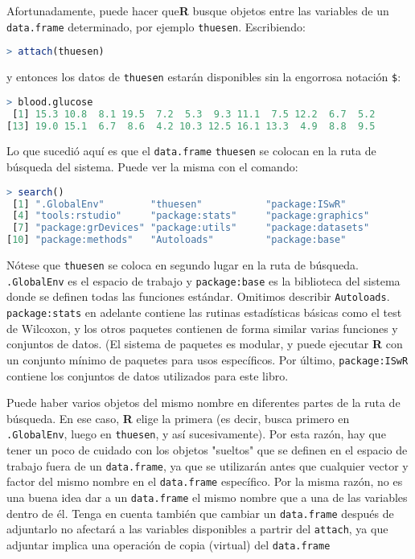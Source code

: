 Afortunadamente, puede hacer que\textbf{R} busque objetos entre las variables
de un \texttt{data.frame} determinado, por ejemplo \texttt{thuesen}. Escribiendo:

\begin{lstlisting}[language=R]
> attach(thuesen)
\end{lstlisting}

y entonces los datos de \texttt{thuesen} estarán disponibles sin la engorrosa
notación \texttt{\$}:

\begin{lstlisting}[language=R]
> blood.glucose
 [1] 15.3 10.8  8.1 19.5  7.2  5.3  9.3 11.1  7.5 12.2  6.7  5.2
[13] 19.0 15.1  6.7  8.6  4.2 10.3 12.5 16.1 13.3  4.9  8.8  9.5
\end{lstlisting}

Lo que sucedió aquí es que el \texttt{data.frame} \texttt{thuesen} se colocan en la
ruta de búsqueda del sistema. Puede ver la misma con el comando:

\begin{lstlisting}[language=R]
> search()
 [1] ".GlobalEnv"        "thuesen"           "package:ISwR"
 [4] "tools:rstudio"     "package:stats"     "package:graphics"
 [7] "package:grDevices" "package:utils"     "package:datasets"
[10] "package:methods"   "Autoloads"         "package:base"
\end{lstlisting}

Nótese que \texttt{thuesen} se coloca en segundo lugar en la ruta de búsqueda.
\texttt{.GlobalEnv} es el espacio de trabajo y \texttt{package:base} es la
biblioteca del sistema donde se definen todas las funciones estándar. Omitimos
describir \texttt{Autoloads}.  \texttt{package:stats} en adelante contiene las
rutinas estadísticas básicas como el test de Wilcoxon, y los otros paquetes
contienen de forma similar varias funciones y conjuntos de datos. (El sistema
de paquetes es modular, y puede ejecutar \textbf{R} con un conjunto mínimo de
paquetes para usos específicos. Por último, \texttt{package:ISwR} contiene los
conjuntos de datos utilizados para este libro.


Puede haber varios objetos del mismo nombre en diferentes partes de la ruta de
búsqueda. En ese caso, \textbf{R} elige la primera (es decir, busca primero en
\texttt{.GlobalEnv}, luego en \texttt{thuesen}, y así sucesivamente). Por esta
razón, hay que tener un poco de cuidado con los objetos "sueltos" que se
definen en el espacio de trabajo fuera de un \texttt{data.frame}, ya que se
utilizarán antes que cualquier vector y factor del mismo nombre en el
\texttt{data.frame} específico. Por la misma razón, no es una buena idea dar a
un \texttt{data.frame} el mismo nombre que a una de las variables dentro de él.
Tenga en cuenta también que cambiar un \texttt{data.frame} después de
adjuntarlo no afectará a las variables disponibles a partrir del
\texttt{attach}, ya que adjuntar implica una operación de copia (virtual) del
\texttt{data.frame}

